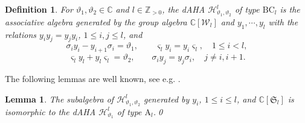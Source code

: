 \documentclass[11pt,reqno]{amsart}
\numberwithin{equation}{section}
\newtheorem{lem}[thm]{Lemma}
\newtheorem{dfn}[thm]{Definition}
\theoremstyle{definition}
\theoremstyle{remark}
\newcommand{\C}{\mathbb{C}}
\newcommand{\Z}{\mathbb{Z}}
\newcommand{\fkS}{\mathfrak{S}}
\newcommand{\scrW}{\mathscr{W}}
\newcommand{\bC}{\mathbb{C}}
\newcommand{\lle}{\leqslant}
\begin{document}
\begin{dfn}\label{def:dAHA-B}
For $\vartheta_1,\vartheta_2\in\bC$ and $l\in\Z_{>0}$, the dAHA $\mathscr{H}_{\vartheta_1,\vartheta_2}^l$ of type $\mathrm{BC}_l$ is the associative algebra generated by the group algebra $\bC[\scrW_l]$ and $y_1,\cdots,y_l$ with the relations $y_iy_j=y_jy_i$, $1\lle i,j\lle l$, and
\[
\sigma_iy_i-y_{i+1}\sigma_i=\vartheta_1,\qquad \varsigma_ly_i=y_i\varsigma_l,\quad 1\lle i< l,
\]
\[
\varsigma_ly_l+y_l\varsigma_l=\vartheta_2,\qquad \sigma_iy_j=y_j\sigma_i,\quad j\ne i,i+1.
\]
\end{dfn}
The following lemmas are well known, see e.g. \cite[Section 2]{Chen2014twisted}.
\begin{lem}
The subalgebra of $\mathscr{H}_{\vartheta_1,\vartheta_2}^l$ generated by $y_i$, $1\lle i\lle l$, and $\C[\fkS_l]$ is isomorphic to the dAHA $\mathscr{H}_{\vartheta_1}^l$ of type $\mathrm A_l$.\qed
\end{lem}
\end{document}
